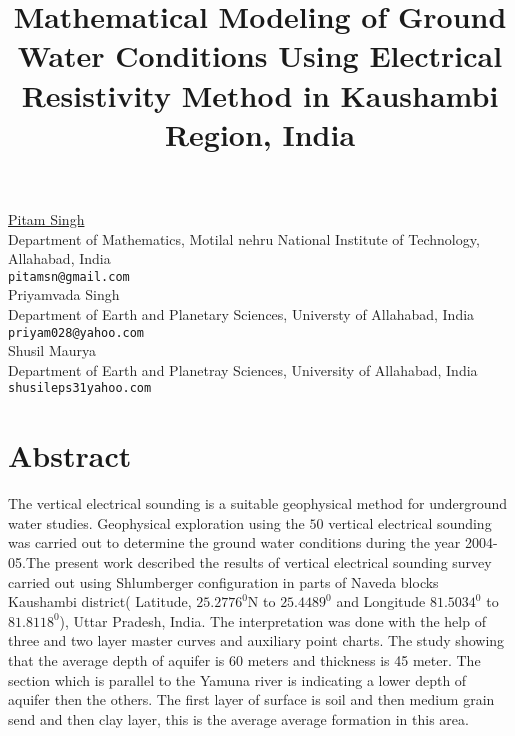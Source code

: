 \documentclass[article,A4,11pt]{llncs}%
\begin{document}
\title{Mathematical Modeling of Ground Water Conditions Using Electrical Resistivity Method in Kaushambi Region, India}
 \author{} \institute{}
\maketitle
\begin{center}
{\large \underline{Pitam Singh}}\\
Department of Mathematics, Motilal nehru National Institute of Technology, Allahabad, India\\
{\tt pitamsn@gmail.com}
\\ \vspace{4mm}
{\large Priyamvada Singh}\\
Department of  Earth and Planetary Sciences, Universty of Allahabad,  India\\
{\tt priyam028@yahoo.com}
\\ \vspace{4mm}
{\large Shusil Maurya}\\
Department of Earth and Planetray Sciences, University of Allahabad, India\\
{\tt shusileps31yahoo.com}
\end{center}

\section*{Abstract}
The vertical electrical sounding is a suitable geophysical method for underground water studies. Geophysical exploration using the $50$ vertical electrical sounding was carried out to determine the ground water conditions during the year 2004-05.The present work described the results of vertical electrical sounding survey carried out using Shlumberger configuration in parts of Naveda blocks Kaushambi district( Latitude, $25.2776^{0}$N to $25.4489^0$ and Longitude $81.5034^0$ to $81.8118^0$), Uttar Pradesh, India. The interpretation was done with the help of three and two layer master curves and auxiliary point charts. The study showing that the average depth of aquifer is $60$ meters and thickness is 45 meter. The section which is parallel to the Yamuna river is indicating a lower depth of aquifer then the others. The first layer of surface is soil and then medium grain send and then clay layer, this is the average average formation in this area.
\end{document}
